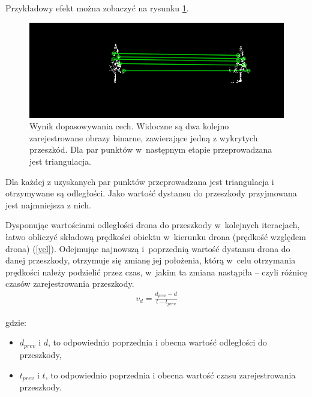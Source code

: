 Przykładowy efekt można zobaczyć na rysunku \ref{fig:matching}.

\begin{figure}
    \centering
    \includegraphics[width=0.9\linewidth]{images/matching.png}
    \caption{Wynik dopasowywania cech. Widoczne są dwa kolejno zarejestrowane obrazy binarne, zawierające jedną z wykrytych przeszkód. Dla par punktów w~następnym etapie przeprowadzana jest triangulacja.}
    \label{fig:matching}
\end{figure}

Dla każdej z uzyskanych par punktów przeprowadzana jest triangulacja i otrzymywane są odległości. Jako wartość dystansu do przeszkody przyjmowana jest najmniejsza z nich.


Dysponując wartościami odległości drona do przeszkody w~kolejnych iteracjach, łatwo obliczyć składową prędkości obiektu w~kierunku drona (prędkość względem drona) (\ref{vel}). Odejmując najnowszą i~poprzednią wartość dystansu drona do danej przeszkody, otrzymuje się zmianę jej położenia, którą w~celu otrzymania prędkości należy podzielić przez czas, w~jakim ta zmiana nastąpiła -- czyli różnicę czasów zarejestrowania przeszkody.
\begin{align}
    v_d = \frac{d_{prev} - d}{t - t_{prev}} \label{vel}
\end{align}

\noindent gdzie:
\begin{itemize}
    \item $d_{prev}$ i $d$, to odpowiednio poprzednia i obecna wartość odległości do przeszkody,
    \item $t_{prev}$ i $t$, to odpowiednio poprzednia i obecna wartość czasu zarejestrowania przeszkody.
\end{itemize}

